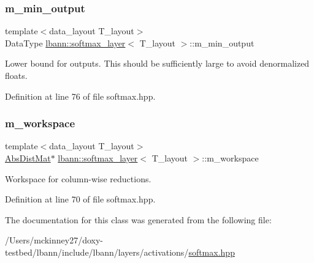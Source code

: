 \subsubsection{\texorpdfstring{m\+\_\+min\+\_\+output}{m\_min\_output}}
{\footnotesize\ttfamily template$<$data\+\_\+layout T\+\_\+layout$>$ \\
Data\+Type \hyperlink{classlbann_1_1softmax__layer}{lbann\+::softmax\+\_\+layer}$<$ T\+\_\+layout $>$\+::m\+\_\+min\+\_\+output\hspace{0.3cm}{\ttfamily [private]}}

Lower bound for outputs. This should be sufficiently large to avoid denormalized floats. 

Definition at line 76 of file softmax.\+hpp.

\mbox{\label{classlbann_1_1softmax__layer_a604e614de25758f0072308c7efdd5bdb}} 
\subsubsection{\texorpdfstring{m\+\_\+workspace}{m\_workspace}}
{\footnotesize\ttfamily template$<$data\+\_\+layout T\+\_\+layout$>$ \\
\hyperlink{base_8hpp_a9a697a504ae84010e7439ffec862b470}{Abs\+Dist\+Mat}$\ast$ \hyperlink{classlbann_1_1softmax__layer}{lbann\+::softmax\+\_\+layer}$<$ T\+\_\+layout $>$\+::m\+\_\+workspace\hspace{0.3cm}{\ttfamily [private]}}

Workspace for column-\/wise reductions. 

Definition at line 70 of file softmax.\+hpp.



The documentation for this class was generated from the following file\+:\begin{DoxyCompactItemize}
\item 
/\+Users/mckinney27/doxy-\/testbed/lbann/include/lbann/layers/activations/\hyperlink{softmax_8hpp}{softmax.\+hpp}\end{DoxyCompactItemize}

